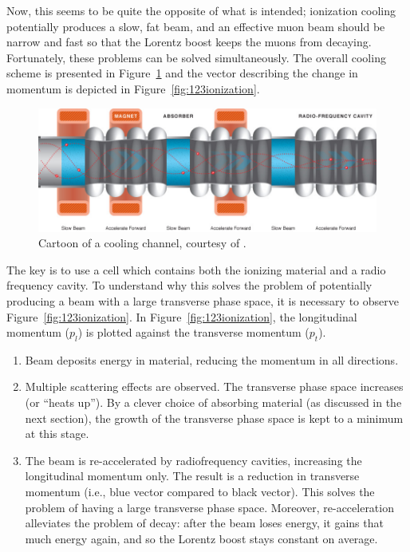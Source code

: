 Now, this seems to be quite the opposite of what is intended; ionization cooling potentially produces a slow, fat beam, and an effective muon beam should be narrow and fast so that the Lorentz boost keeps the muons from decaying. Fortunately, these problems can be solved simultaneously. The overall cooling scheme is presented in  Figure~\ref{fig:coolingchannel} and the vector describing the change in momentum is depicted in Figure~\ref{fig:123ionization}.
\begin{figure}
  \begin{center} 
    \includegraphics[width=\textwidth]{Figures/coolingchannel} 
  \caption[Cartoon of a cooling channel.]{Cartoon of a cooling channel, courtesy of \cite{map}.}
  \label{fig:coolingchannel}
 \end{center}
\end{figure}

The key is to use a cell which contains both the ionizing material and a radio frequency cavity. To understand why this solves the problem of potentially producing a beam with a large transverse phase space, it is necessary to observe Figure~\ref{fig:123ionization}. In Figure~\ref{fig:123ionization}, the longitudinal momentum ($p_l$) is plotted against the transverse momentum ($p_t$). 
   \begin{enumerate} 
  \item{Beam deposits energy in material, reducing the momentum in all directions.}
  \item{Multiple scattering effects are observed. The transverse phase space increases (or ``heats up''). By a clever choice of absorbing material (as discussed in the next section), the growth of the transverse phase space is kept to a minimum at this stage.}
  \item{The beam is re-accelerated by radiofrequency cavities, increasing the longitudinal momentum only. The result is a reduction in transverse momentum (i.e., blue vector compared to black vector). This solves the problem of having a large transverse phase space. Moreover, re-acceleration alleviates the problem of decay: after the beam loses energy, it gains that much energy again, and so the Lorentz boost stays constant on average.}
\end{enumerate}

